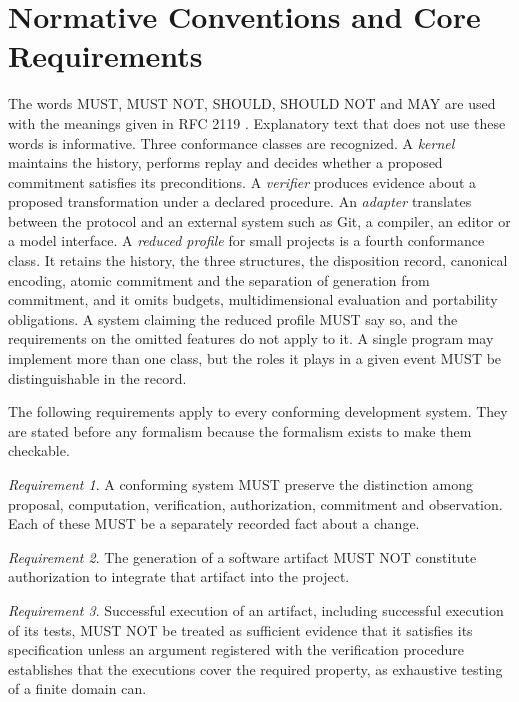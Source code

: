 \documentclass[11pt]{article}
\theoremstyle{remark}
\newtheorem{requirement}{Requirement}
\begin{document}
\section{Normative Conventions and Core Requirements}\label{sec:norm}

The words MUST, MUST NOT, SHOULD, SHOULD NOT and MAY are used with the meanings given in RFC 2119 \cite{rfc2119}. Explanatory text that does not use these words is informative. Three conformance classes are recognized. A \emph{kernel} maintains the history, performs replay and decides whether a proposed commitment satisfies its preconditions. A \emph{verifier} produces evidence about a proposed transformation under a declared procedure. An \emph{adapter} translates between the protocol and an external system such as Git, a compiler, an editor or a model interface. A \emph{reduced profile} for small projects is a fourth conformance class. It retains the history, the three structures, the disposition record, canonical encoding, atomic commitment and the separation of generation from commitment, and it omits budgets, multidimensional evaluation and portability obligations. A system claiming the reduced profile MUST say so, and the requirements on the omitted features do not apply to it. A single program may implement more than one class, but the roles it plays in a given event MUST be distinguishable in the record.

The following requirements apply to every conforming development system. They are stated before any formalism because the formalism exists to make them checkable.

\begin{requirement}
A conforming system MUST preserve the distinction among proposal, computation, verification, authorization, commitment and observation. Each of these MUST be a separately recorded fact about a change.
\end{requirement}

\begin{requirement}
The generation of a software artifact MUST NOT constitute authorization to integrate that artifact into the project.
\end{requirement}

\begin{requirement}
Successful execution of an artifact, including successful execution of its tests, MUST NOT be treated as sufficient evidence that it satisfies its specification unless an argument registered with the verification procedure establishes that the executions cover the required property, as exhaustive testing of a finite domain can.
\end{requirement}
\end{document}
